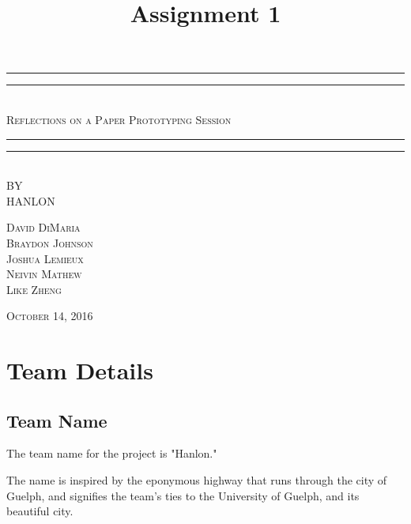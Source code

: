 \documentclass[12pt,letterpaper]{article}
\title{Assignment 1}
\begin{document}
\begin{titlepage}
    \centering
    \vspace*{\baselineskip}
    \rule{\textwidth}{1.6pt}\vspace*{-\baselineskip}\vspace*{2pt}
    \rule{\textwidth}{0.4pt}\\[1.5\baselineskip]
    {\LARGE \textsc{Reflections on a Paper Prototyping Session}}\\[\baselineskip]
	\rule{\textwidth}{0.4pt}\vspace*{-\baselineskip}\vspace{4pt}    
    \rule{\textwidth}{2pt}\\[2\baselineskip]
   
    \vspace*{5\baselineskip}
    \textsc{BY}\\[0.25\baselineskip]
    {\LARGE HANLON} \\
    
    \vspace*{\baselineskip}
    {\textsc{David DiMaria \\ Braydon Johnson \\ Joshua Lemieux \\ Neivin Mathew \\ Like Zheng} \par}
    \vfill
    {\scshape October 14, 2016} \\
  \end{titlepage}
  
  
\tableofcontents
\lhead{} %
\clearpage
{} %
    
\clearpage
\section{Team Details}
\subsection{Team Name}
The team name for the project is "Hanlon."\par
The name is inspired by the eponymous highway that runs through the city of Guelph, and signifies the team's ties to the University of Guelph, and its beautiful city.\\
\end{document}
